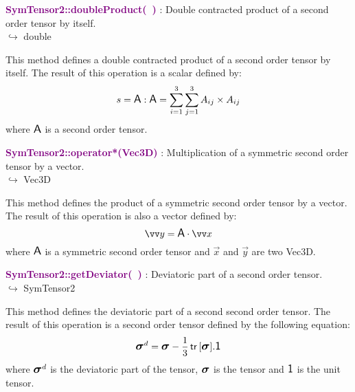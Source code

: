 \textcolor{purple}{\textbf{SymTensor2::doubleProduct(~)}}\label{SymTensor2::doubleProduct()} : Double contracted product of a second order tensor by itself.\\ \hspace*{5mm}$\hookrightarrow$ double

This method defines a double contracted product of a second order tensor by itself.
The result of this operation is a scalar defined by:
\begin{equation*}
s = \mbox{\large\ensuremath{\mathsf{A}}} : \mbox{\large\ensuremath{\mathsf{A}}} = \sum_{i=1}^{3} \sum_{j=1}^{3} A_{ij}\times A_{ij}
\end{equation*}
where $\mbox{\large\ensuremath{\mathsf{A}}}$ is a second order tensor.

\textcolor{purple}{\textbf{SymTensor2::operator*(Vec3D)}}\label{SymTensor2::operator*(Vec3D)} : Multiplication of a symmetric second order tensor by a vector.\\ \hspace*{5mm}$\hookrightarrow$ Vec3D

  This method defines the product of a symmetric second order tensor by a vector.
  The result of this operation is also a vector defined by:
\begin{equation*}
\overrightarrow{y} = \A \cdot \overrightarrow{x}
\end{equation*}
where $\mbox{\large\ensuremath{\mathsf{A}}}$ is a symmetric second order tensor and $\overrightarrow{x}$ and $\overrightarrow{y}$ are two Vec3D.

\textcolor{purple}{\textbf{SymTensor2::getDeviator(~)}}\label{SymTensor2::getDeviator()} : Deviatoric part of a second order tensor.\\ \hspace*{5mm}$\hookrightarrow$ SymTensor2

This method defines the deviatoric part of a second second order tensor.
The result of this operation is a second order tensor defined by the following equation:
\begin{equation*}
\mbox{\large\ensuremath{\boldsymbol{\sigma}}}^d=\mbox{\large\ensuremath{\boldsymbol{\sigma}}}-\frac{1}{3}\mbox{\ensuremath{\mathsf{\,tr\,}}}[\mbox{\large\ensuremath{\boldsymbol{\sigma}}}].\mbox{\large\ensuremath{\mathsf{1}}}
\end{equation*}
where $\mbox{\large\ensuremath{\boldsymbol{\sigma}}}^d$ is the deviatoric part of the tensor, $\mbox{\large\ensuremath{\boldsymbol{\sigma}}}$ is the tensor and $\mbox{\large\ensuremath{\mathsf{1}}}$ is the unit tensor.

